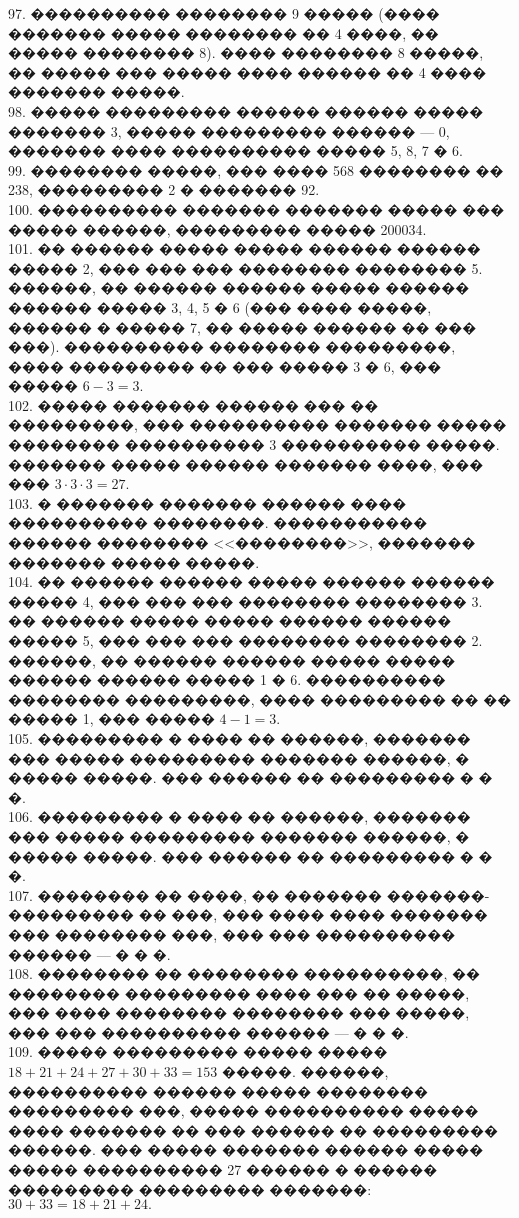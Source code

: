\documentclass[12pt]{article}
\begin{document}
97. ���������� �������� 9 ����� (���� ������� ����� �������� �� 4 ����, �� ����� �������� 8). ���� �������� 8 �����, �� ����� ��� ����� ���� ������ �� 4 ���� ������� �����.\\
98. ����� ��������� ������ ������ ����� ������� 3, ����� ��������� ������ --- 0, ������� ���� ���������� ����� 5, 8, 7 � 6.\\
99. �������� �����, ��� ���� 568 �������� �� 238, ��������� 2 � ������� 92.\\
100. ���������� ������� ������� ����� ��� ����� ������, ��������� ����� 200034.\\
101. �� ������ ����� ����� ������ ������ ����� 2, ��� ��� ��� �������� �������� 5. ������, �� ������ ������ ����� ������ ������ ����� 3, 4, 5 � 6 (��� ���� �����, ������ � ����� 7, �� ����� ������ �� ��� ���). ���������� �������� ���������, ���� ��������� �� ��� ����� 3 � 6, ��� ����� $6-3=3.$\\
102. ����� ������� ������ ��� �� ���������, ��� ���������� ������� ����� �������� ���������� 3 ���������� �����. ������� ����� ������ ������� ����, ��� ��� $3\cdot3\cdot3=27.$\\
103. � ������� ������� ������ ���� ���������� ��������. ����������� ������ �������� <<��������>>, ������� ������� ����� �����.\\
104. �� ������ ������ ����� ������ ������ ����� 4, ��� ��� ��� �������� �������� 3. �� ������ ����� ����� ������ ������ ����� 5, ��� ��� ��� �������� �������� 2. ������, �� ������ ������ ����� ����� ������ ������ ����� 1 � 6. ���������� �������� ���������, ���� ��������� �� �� ����� 1, ��� ����� $4-1=3.$\\
105. ��������� � ���� �� ������, ������� ��� ����� ��������� ������� ������, � ����� �����. ��� ������ �� ��������� � � �.\\
106. ��������� � ���� �� ������, ������� ��� ����� ��������� ������� ������, � ����� �����. ��� ������ �� ��������� � � �.\\
107. �������� �� ����, �� ������� �������-��������� �� ���, ��� ���� ���� ������� ��� �������� ���, ��� ��� ���������� ������ --- � � �.\\
108. �������� �� �������� ����������, �� �������� ��������� ���� ��� �� �����, ��� ���� �������� �������� ��� �����, ��� ��� ���������� ������ --- � � �.\\
109. ����� ��������� ����� ����� $18+21+24+27+30+33=153$ �����. ������, ���������� ������ ����� �������� ��������� ���, ����� ���������� ����� ���� ������� �� ��� ������ �� ��������� ������. ��� ����� ������� ������ ����� ����� ���������� 27 ������ � ������ ��������� ��������� �������: $30+33=18+21+24.$\\
\end{document}
